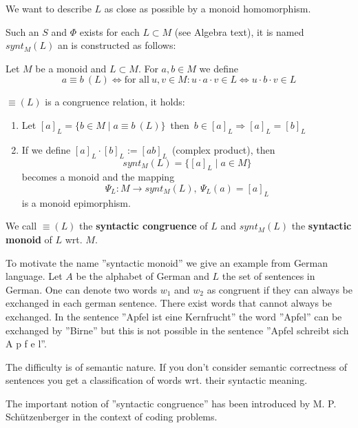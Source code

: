 We want to describe $L$ as close as possible by a monoid homomorphism.

Such an $S$ and $\Phi$ exists for each $L \subset M$ (see Algebra text), it is
named $synt_M(L)$ an is constructed as follows:

\begin{definition}
Let $M$ be a monoid and $L \subset M$. For $a, b \in M$ we define
\[ a \equiv b\ (L) \Leftrightarrow \mbox{for all}\ u, v \in M: u \cdot a \cdot v
\in L \Leftrightarrow u \cdot b \cdot v \in L
\]
\end{definition}

$\equiv (L)$ is a congruence relation, it holds:
\begin{enumerate}
  \item Let $[a]_L = \{ b \in M \mid a \equiv b\ (L) \}$\ then\ $b \in [a]_L
  \Rightarrow [a]_L = [b]_L $
  \item If we define $[a]_L \cdot [b]_L := [a b]_L$\ (complex product), then
  \[synt_M(L) = \{ [a]_L \mid a \in M \}\] becomes a monoid and the mapping
  \[\Psi_L : M \to synt_M(L),\ \Psi_L(a) = [a]_L\]
   is a monoid epimorphism.
\end{enumerate}

We call $\equiv (L)$ the {\bf syntactic congruence} of $L$ and $synt_M(L)$ the
{\bf syntactic monoid} of $L$ wrt. $M$.

To motivate the name ''syntactic monoid'' we give an example from German
language.
Let $A$ be the alphabet of German and $L$ the set of sentences in German. One can
denote two words $w_1$ and $w_2$ as congruent if they can always be exchanged in
each german sentence. There exist words that cannot always be exchanged. In the
sentence ''Apfel ist eine Kernfrucht'' the word ''Apfel'' can be exchanged by
''Birne'' but this is not possible in the sentence ''Apfel schreibt sich A p f e
l''.

The difficulty is of semantic nature. If you don't consider semantic correctness
of sentences you get a classification of words wrt. their syntactic meaning.

The important notion of ''syntactic congruence'' has been introduced by M. P.
Schützenberger in the context of coding problems.
